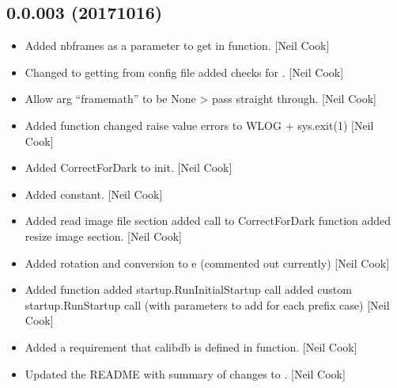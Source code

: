 \documentclass[a4paper,10pt,english]{report}
\begin{document}
\subsection{0.0.003 (2017\sphinxhyphen{}10\sphinxhyphen{}16)}
\label{\detokenize{misc/changelog:id566}}\begin{itemize}
\item {} 
Added nbframes as a parameter to get in  function. {[}Neil
Cook{]}

\item {} 
Changed  to getting from config file added checks for
. {[}Neil Cook{]}

\item {} 
Allow  arg “framemath” to be None \textendash{}\textgreater{} pass straight
through. {[}Neil Cook{]}

\item {} 
Added  function changed raise value errors to WLOG +
sys.exit(1) {[}Neil Cook{]}

\item {} 
Added CorrectForDark to init. {[}Neil Cook{]}

\item {} 
Added  constant. {[}Neil Cook{]}

\item {} 
Added read image file section added call to CorrectForDark function
added resize image section. {[}Neil Cook{]}

\item {} 
Added rotation and conversion to e\sphinxhyphen{} (commented out currently) {[}Neil
Cook{]}

\item {} 
Added  function added startup.RunInitialStartup call added
custom startup.RunStartup call (with parameters to add for each prefix
case) {[}Neil Cook{]}

\item {} 
Added a requirement that calibdb is defined in  function.
{[}Neil Cook{]}

\item {} 
Updated the README with summary of changes to .
{[}Neil Cook{]}

\end{itemize}
\end{document}
